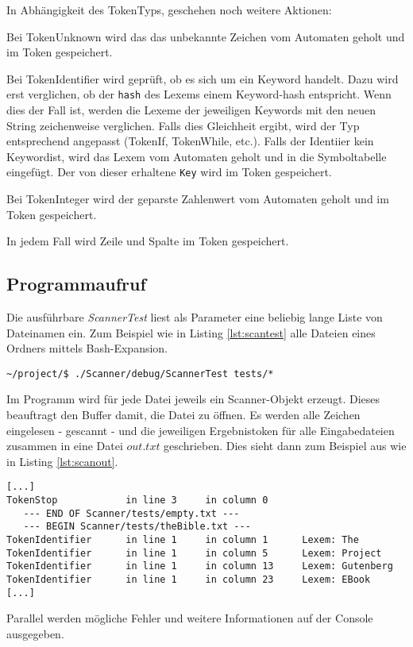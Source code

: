 \documentclass[
a4paper,   %
11pt,      %
oneside,   %
onecolumn, %
final      %
]{article}
\newcommand{\code}[1]{\lstinline$#1$}
\begin{document}
In Abhängigkeit des TokenTyps, geschehen noch weitere Aktionen:
\begin{description}
\item Bei TokenUnknown wird das das unbekannte Zeichen vom Automaten geholt und im Token gespeichert.
\item \label{anc:hashcompare} Bei TokenIdentifier wird geprüft, ob es sich um ein Keyword handelt.
Dazu wird erst verglichen, ob der \code{hash} des Lexems einem Keyword-hash entspricht.
Wenn dies der Fall ist, werden die Lexeme der jeweiligen Keywords mit den neuen String zeichenweise verglichen.
Falls dies Gleichheit ergibt, wird der Typ entsprechend angepasst (TokenIf, TokenWhile, etc.).
Falls der Identiier kein Keywordist, wird das Lexem vom Automaten geholt und in die Symboltabelle eingefügt.
Der von dieser erhaltene \code{Key} wird im Token gespeichert.
\item Bei TokenInteger wird der geparste Zahlenwert vom Automaten geholt und im Token gespeichert.
\end{description}

In jedem Fall wird Zeile und Spalte im Token gespeichert.

\subsection{Programmaufruf}
Die ausführbare \emph{ScannerTest} liest als Parameter eine beliebig lange Liste von Dateinamen ein. Zum Beispiel wie in Listing \ref{lst:scantest} alle Dateien eines Ordners mittels Bash-Expansion.
\begin{lstlisting}[language=PseudoCode, caption={Aufruf von ScannerTest}, label=lst:scantest]
~/project/$ ./Scanner/debug/ScannerTest tests/*
\end{lstlisting}
Im Programm wird für jede Datei jeweils ein Scanner-Objekt erzeugt. Dieses beauftragt den Buffer damit, die Datei zu öffnen. Es werden alle Zeichen eingelesen - gescannt - und die jeweiligen Ergebnistoken für alle Eingabedateien zusammen in eine Datei $out.txt$ geschrieben. Dies sieht dann zum Beispiel aus wie in Listing \ref{lst:scanout}.
\begin{lstlisting}[language=PseudoCode, firstnumber=57, caption={Dateiausgabe von ScannerTest}, label=lst:scanout]
[...]
TokenStop            in line 3     in column 0
   --- END OF Scanner/tests/empty.txt ---
   --- BEGIN Scanner/tests/theBible.txt ---
TokenIdentifier	     in line 1     in column 1      Lexem: The
TokenIdentifier	     in line 1     in column 5      Lexem: Project
TokenIdentifier	     in line 1     in column 13     Lexem: Gutenberg
TokenIdentifier      in line 1     in column 23     Lexem: EBook
[...]
\end{lstlisting}
Parallel werden mögliche Fehler und weitere Informationen auf der Console ausgegeben.
\end{document}
